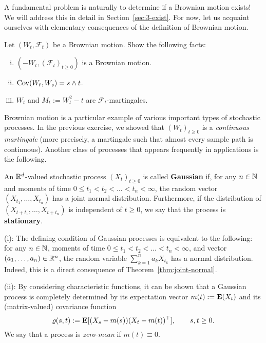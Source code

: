 A fundamental problem is naturally to determine if a Brownian motion exists! We will address this in detail in Section~\ref{sec:3-exist}. For now, let us acquaint ourselves with elementary consequences of the definition of Brownian motion.
\begin{exercise}[Important!]
Let $(W_t,\mathcal{F}_t)$ be a Brownian motion. Show the following facts:
\begin{enumerate}[(i)]
    \item $(-W_t,(\mathcal{F}_t)_{t\ge 0})$ is a Brownian motion.
    \item $\operatorname{Cov}(W_t, W_s) = s\wedge t$.
    \item $W_t$ and $M_t:=W_t^2-t$ are $\mathcal{F}_t$-martingales.
\end{enumerate}
\end{exercise}

Brownian motion is a particular example of various important types of stochastic processes. In the previous exercise, we showed that $(W_t)_{t\ge 0}$ is a \emph{continuous martingale} (more precisely, a martingale such that almost every sample path is continuous). Another class of processes that appears frequently in applications is the following.
\begin{definition}
\label{def:gaussian-proc}
An $\mathbb{R}^d$-valued stochastic process $(X_t)_{t\ge 0}$ is called \textbf{Gaussian} if, for any $n\in\mathbb{N}$ and moments of time $0\le t_1<t_2<\ldots <t_n<\infty$, the random vector $(X_{t_1},\ldots,X_{t_n})$ has a joint normal distribution. Furthermore, if the distribution of $(X_{t+t_1},\ldots,X_{t+t_n})$ is independent of $t\ge 0$, we say that the process is \textbf{stationary}.
\end{definition}

\begin{remark}
\label{rmk:Gaussian}
(i): The defining condition of Gaussian processes is equivalent to the following: for any $n\in\mathbb{N}$, moments of time $0\le t_1<t_2<\ldots <t_n<\infty$, and vector $(a_1,\ldots,a_n)\in\mathbb{R}^n$, the random variable $\sum_{k=1}^n a_k X_{t_k}$ has a normal distribution. Indeed, this is a direct consequence of Theorem~\ref{thm:joint-normal}.

(ii): By considering characteristic functions, it can be shown that a Gaussian process is completely determined by its expectation vector $m(t):=\mathbf{E}(X_t)$ and its (matrix-valued) covariance function
\begin{equation*}
    \varrho(s,t) := \mathbf{E}[(X_s-m(s))(X_t-m(t))^\top], \qquad s,t\ge 0.
\end{equation*}
We say that a process is \emph{zero-mean} if $m(t)\equiv 0$.
\end{remark}

